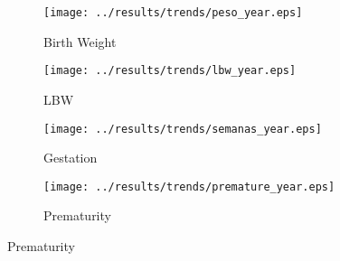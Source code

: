 \documentclass[12pt]{article}
\begin{document}
\begin{spacing}{1.4}
\begin{figure}[htpb!]
  \begin{center}
    \caption{Longer Term Trends in Birth Outcomes in Chile}
    \label{trendlong}
    \begin{subfigure}{.5\textwidth}
      \centering
      \texttt{[image: ../results/trends/peso\_year.eps]}
      \caption{Birth Weight}
      \label{trendBW}
    \end{subfigure}%
    \begin{subfigure}{.5\textwidth}
      \centering
      \texttt{[image: ../results/trends/lbw\_year.eps]}
      \caption{LBW}
      \label{trendLBW}
    \end{subfigure}
    \begin{subfigure}{.5\textwidth}
      \centering
      \texttt{[image: ../results/trends/semanas\_year.eps]}
      \caption{Gestation}
      \label{trendGest}
    \end{subfigure}%
    \begin{subfigure}{.5\textwidth}
      \centering
      \texttt{[image: ../results/trends/premature\_year.eps]}
      \caption{Prematurity}
      \label{trendPrem}
    \end{subfigure}
  \end{center}
\end{figure}


\end{spacing}
\end{document}
